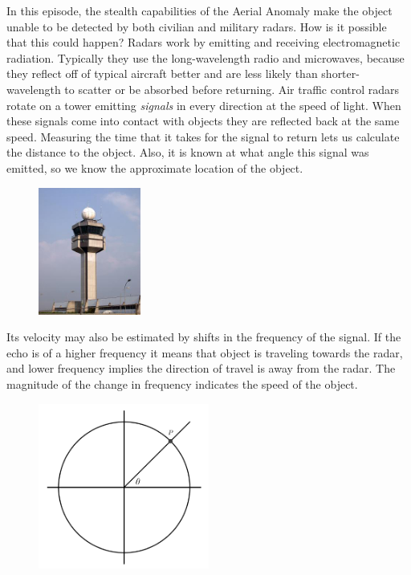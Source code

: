 
In this episode, the stealth capabilities of the Aerial Anomaly make the object unable to be detected by both civilian and military radars. How is it possible that this could happen? Radars work by emitting and receiving electromagnetic radiation. Typically they use the long-wavelength radio and microwaves, because they reflect off of typical aircraft better and are less likely than shorter-wavelength to scatter or be absorbed before returning. Air traffic control radars rotate on a tower emitting \emph{signals} in every direction at the speed of light. When these signals come into contact with objects they are reflected back at the same speed. Measuring the time that it takes for the signal to return lets us calculate the distance to the object. Also, it is known at what angle this signal was emitted, so we know the approximate location of the object. \\

	\begin{figure}[H]
	   \centering
	   \includegraphics[width=0.3\textwidth]{season1/112/images/tower.jpg} 
	\end{figure}

Its velocity may also be estimated by shifts in the frequency of the signal. If the echo is of a higher frequency it means that object is traveling towards the radar, and lower frequency implies the direction of travel is away from the radar. The magnitude of the change in frequency indicates the speed of the object. \\

	\begin{figure}[H]
	   \centering
	   \includegraphics[width=0.5\textwidth]{season1/112/images/circle.png} 
	\end{figure}

